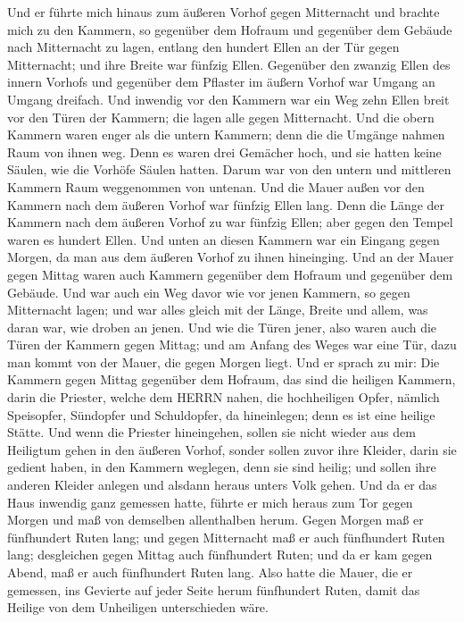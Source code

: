  Und er führte mich hinaus zum äußeren Vorhof gegen
Mitternacht und brachte mich zu den Kammern, so gegenüber dem Hofraum
und gegenüber dem Gebäude nach Mitternacht zu lagen, 
entlang den hundert Ellen an der Tür gegen Mitternacht; und ihre Breite
war fünfzig Ellen.  Gegenüber den zwanzig Ellen des innern
Vorhofs und gegenüber dem Pflaster im äußern Vorhof war Umgang an Umgang
dreifach.  Und inwendig vor den Kammern war ein Weg zehn
Ellen breit vor den Türen der Kammern; die lagen alle gegen Mitternacht.
 Und die obern Kammern waren enger als die untern Kammern;
denn die die Umgänge nahmen Raum von ihnen weg.  Denn es
waren drei Gemächer hoch, und sie hatten keine Säulen, wie die Vorhöfe
Säulen hatten. Darum war von den untern und mittleren Kammern Raum
weggenommen von untenan.  Und die Mauer außen vor den
Kammern nach dem äußeren Vorhof war fünfzig Ellen lang. 
Denn die Länge der Kammern nach dem äußeren Vorhof zu war fünfzig Ellen;
aber gegen den Tempel waren es hundert Ellen.  Und unten an
diesen Kammern war ein Eingang gegen Morgen, da man aus dem äußeren
Vorhof zu ihnen hineinging.  Und an der Mauer gegen Mittag
waren auch Kammern gegenüber dem Hofraum und gegenüber dem Gebäude.
 Und war auch ein Weg davor wie vor jenen Kammern, so gegen
Mitternacht lagen; und war alles gleich mit der Länge, Breite und allem,
was daran war, wie droben an jenen.  Und wie die Türen
jener, also waren auch die Türen der Kammern gegen Mittag; und am Anfang
des Weges war eine Tür, dazu man kommt von der Mauer, die gegen Morgen
liegt.  Und er sprach zu mir: Die Kammern gegen Mittag
gegenüber dem Hofraum, das sind die heiligen Kammern, darin die
Priester, welche dem HERRN nahen, die hochheiligen Opfer, nämlich
Speisopfer, Sündopfer und Schuldopfer, da hineinlegen; denn es ist eine
heilige Stätte.  Und wenn die Priester hineingehen, sollen
sie nicht wieder aus dem Heiligtum gehen in den äußeren Vorhof, sonder
sollen zuvor ihre Kleider, darin sie gedient haben, in den Kammern
weglegen, denn sie sind heilig; und sollen ihre anderen Kleider anlegen
und alsdann heraus unters Volk gehen.  Und da er das Haus
inwendig ganz gemessen hatte, führte er mich heraus zum Tor gegen Morgen
und maß von demselben allenthalben herum.  Gegen Morgen maß
er fünfhundert Ruten lang;  und gegen Mitternacht maß er
auch fünfhundert Ruten lang;  desgleichen gegen Mittag auch
fünfhundert Ruten;  und da er kam gegen Abend, maß er auch
fünfhundert Ruten lang.  Also hatte die Mauer, die er
gemessen, ins Gevierte auf jeder Seite herum fünfhundert Ruten, damit
das Heilige von dem Unheiligen unterschieden wäre.

